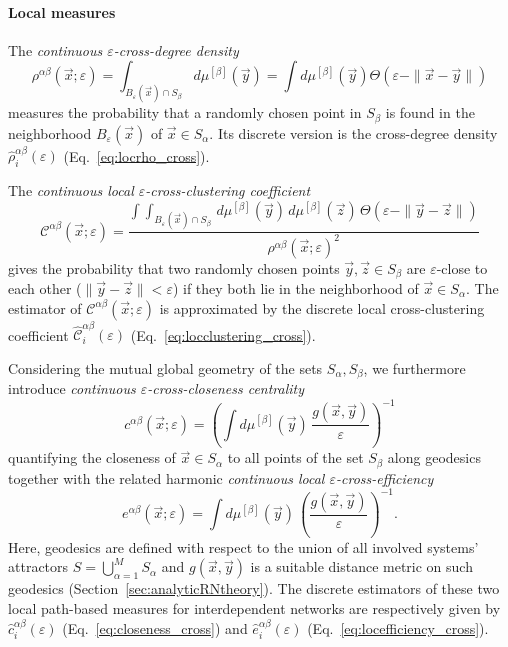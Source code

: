 \paragraph{Local measures}

The \emph{continuous $\varepsilon$-cross-degree density}
\begin{equation}
\rho^{\alpha\beta}(\vec{x};\varepsilon) = \int_{B_\varepsilon(\vec{x}) \cap S_\beta} d\mu^{[\beta]}(\vec{y}) = \int d\mu^{[\beta]}(\vec{y}) \Theta(\varepsilon - \|\vec{x}-\vec{y}\|)
\end{equation}
\noindent
measures the probability that a randomly chosen point in $S_\beta$ is found in the neighborhood $B_\varepsilon(\vec{x})$ of $\vec{x}\in S_\alpha$. Its discrete version is the cross-degree density $\hat{\rho}_i^{\alpha\beta}(\varepsilon)$ (Eq.~\ref{eq:locrho_cross}).

The \emph{continuous local $\varepsilon$-cross-clustering coefficient}
\begin{equation}
\mathcal{C}^{\alpha\beta}(\vec{x};\varepsilon) = \frac{\int\!\!\!\int_{B_\varepsilon(\vec{x}) \cap S_\beta} \,d\mu^{[\beta]}(\vec{y})\,d\mu^{[\beta]}(\vec{z})\, \Theta(\varepsilon-\|\vec{y}-\vec{z}\|)}{\rho^{\alpha\beta}(\vec{x};\varepsilon)^2}
\end{equation}
gives the probability that two randomly chosen points $\vec{y},\vec{z}\in S_\beta$ are $\varepsilon$-close to each other ($\|\vec{y}-\vec{z}\|<\varepsilon$) if they both lie in the neighborhood of $\vec{x}\in S_\alpha$. The estimator of $\mathcal{C}^{\alpha\beta}(\vec{x};\varepsilon)$ is approximated by the discrete local cross-clustering coefficient $\hat{\mathcal{C}}_i^{\alpha\beta}(\varepsilon)$ (Eq.~\ref{eq:locclustering_cross}).

Considering the mutual global geometry of the sets $S_\alpha,S_\beta$, we furthermore introduce \textit{continuous $\varepsilon$-cross-closeness centrality}
\begin{equation}
c^{\alpha\beta}(\vec{x};\varepsilon) = \left( \int d\mu^{[\beta]}(\vec{y}) \, \frac{g(\vec{x},\vec{y})}{\varepsilon} \right)^{-1}
\end{equation}
quantifying the closeness of $\vec{x}\in S_\alpha$ to all points of the set $S_\beta$ along geodesics together with the related harmonic \textit{continuous local $\varepsilon$-cross-efficiency}
\begin{equation}
e^{\alpha\beta}(\vec{x};\varepsilon) = \int d\mu^{[\beta]}(\vec{y}) \, \left( \frac{g(\vec{x},\vec{y})}{\varepsilon} \right)^{-1}.
\end{equation}
Here, geodesics are defined with respect to the union of all involved systems' attractors $S=\bigcup_{\alpha=1}^M S_\alpha$ and $g(\vec{x},\vec{y})$ is a suitable distance metric on such geodesics (Section~\ref{sec:analyticRNtheory}). The discrete estimators of these two local path-based measures for interdependent networks are respectively given by $\hat{c}_i^{\alpha\beta}(\varepsilon)$ (Eq.~\ref{eq:closeness_cross}) and $\hat{e}_i^{\alpha\beta}(\varepsilon)$ (Eq.~\ref{eq:locefficiency_cross}).


